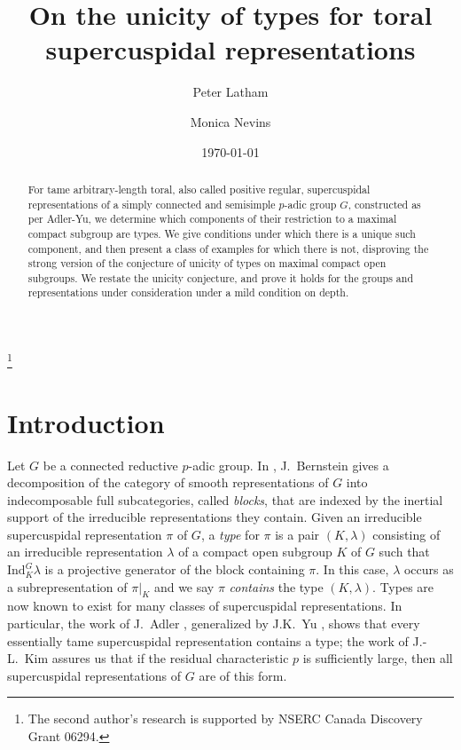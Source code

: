 \documentclass[12pt]{amsart}
\newcommand{\Ind}{\mathrm{Ind}} %
\theoremstyle{plain}
\theoremstyle{definition}
\theoremstyle{remark}
\numberwithin{equation}{section}
\numberwithin{figure}{section}
\begin{document}
\title{On the unicity of types for toral supercuspidal representations}
\author{Peter Latham}
\address{Department of Mathematics, King's College London, Strand, London, UK}

\author{Monica Nevins}
\address{Department of Mathematics and Statistics, University of Ottawa, Ottawa, Canada}
\thanks{The second author's research is supported by NSERC Canada Discovery Grant 06294.}

\date{\today}


\begin{abstract}
For tame arbitrary-length toral, also called positive regular, supercuspidal representations of a simply connected and semisimple $p$-adic group $G$, constructed as per Adler-Yu, we determine which components of their restriction to a maximal compact subgroup are types.  We give conditions under which there is a unique such component, and then present a class of examples for which there is not, disproving the strong version of the conjecture of unicity of types on maximal compact open subgroups.  We restate the unicity conjecture, and prove it holds for the groups and representations under consideration under a mild condition on depth.
\end{abstract}

\maketitle

\section{Introduction}


Let $G$ be a connected reductive $p$-adic group.  
In \cite{Bernstein1984}, J.~Bernstein gives a decomposition of the category of smooth 
representations of $G$ into indecomposable full subcategories, called \emph{blocks}, that are indexed
by the inertial support of the irreducible representations they contain. Given an irreducible supercuspidal representation $\pi$ of $G$, a \emph{type} for $\pi$ is a pair $(K, \lambda)$ consisting of an
irreducible representation $\lambda$ of a compact open subgroup $K$ of $G$ such that $\Ind_K^G \lambda$ is a projective generator of the block containing $\pi$.  In this case, $\lambda$ occurs as a subrepresentation of $\pi|_K$ and we say $\pi$ \emph{contains} the type $(K,\lambda)$.  Types are now known to exist for many classes
of supercuspidal representations.  In particular, the work of J.~Adler \cite{Adler1998}, generalized by J.K.~Yu \cite{Yu2001}, shows that every essentially tame
supercuspidal representation contains a type; the work of J.-L.~Kim \cite{Kim2007} assures us that if the residual characteristic $p$ is sufficiently large, then all supercuspidal representations of $G$ are of this form.
\end{document}
